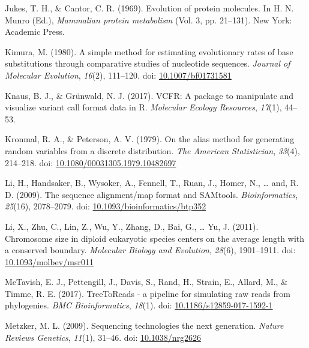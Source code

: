 \documentclass[12pt,]{article}
\begin{document}
\leavevmode\hypertarget{ref-JC69}{}%
Jukes, T. H., \& Cantor, C. R. (1969). Evolution of protein molecules. In H. N. Munro (Ed.), \emph{Mammalian protein metabolism} (Vol. 3, pp. 21--131). New York: Academic Press.

\leavevmode\hypertarget{ref-Kimura_1980}{}%
Kimura, M. (1980). A simple method for estimating evolutionary rates of base substitutions through comparative studies of nucleotide sequences. \emph{Journal of Molecular Evolution}, \emph{16}(2), 111--120. doi: \href{https://doi.org/10.1007/bf01731581}{10.1007/bf01731581}

\leavevmode\hypertarget{ref-Knaus_2017}{}%
Knaus, B. J., \& Grünwald, N. J. (2017). VCFR: A package to manipulate and visualize variant call format data in R. \emph{Molecular Ecology Resources}, \emph{17}(1), 44--53.

\leavevmode\hypertarget{ref-Kronmal_1979}{}%
Kronmal, R. A., \& Peterson, A. V. (1979). On the alias method for generating random variables from a discrete distribution. \emph{The American Statistician}, \emph{33}(4), 214--218. doi: \href{https://doi.org/10.1080/00031305.1979.10482697}{10.1080/00031305.1979.10482697}

\leavevmode\hypertarget{ref-Li_2009}{}%
Li, H., Handsaker, B., Wysoker, A., Fennell, T., Ruan, J., Homer, N., \ldots{} and, R. D. (2009). The sequence alignment/map format and SAMtools. \emph{Bioinformatics}, \emph{25}(16), 2078--2079. doi: \href{https://doi.org/10.1093/bioinformatics/btp352}{10.1093/bioinformatics/btp352}

\leavevmode\hypertarget{ref-Li_2011}{}%
Li, X., Zhu, C., Lin, Z., Wu, Y., Zhang, D., Bai, G., \ldots{} Yu, J. (2011). Chromosome size in diploid eukaryotic species centers on the average length with a conserved boundary. \emph{Molecular Biology and Evolution}, \emph{28}(6), 1901--1911. doi: \href{https://doi.org/10.1093/molbev/msr011}{10.1093/molbev/msr011}

\leavevmode\hypertarget{ref-McTavish_2017}{}%
McTavish, E. J., Pettengill, J., Davis, S., Rand, H., Strain, E., Allard, M., \& Timme, R. E. (2017). TreeToReads - a pipeline for simulating raw reads from phylogenies. \emph{BMC Bioinformatics}, \emph{18}(1). doi: \href{https://doi.org/10.1186/s12859-017-1592-1}{10.1186/s12859-017-1592-1}

\leavevmode\hypertarget{ref-Metzker_2009}{}%
Metzker, M. L. (2009). Sequencing technologies the next generation. \emph{Nature Reviews Genetics}, \emph{11}(1), 31--46. doi: \href{https://doi.org/10.1038/nrg2626}{10.1038/nrg2626}
\end{document}
